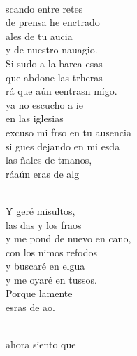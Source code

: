 \documentclass[12pt]{article}
\begin{document}
\begin{multicols*}{2}
\begin{cancion}%
	    \\
	scando entre retes\\
	de prensa he enctrado\\
	ales de tu aucia  \\
	y de nuestro nauagio.\\
	Si sudo a la barca esas\\
	que abdone las trheras\\
	rá que aún eentrasn mígo. \\
\jump
	 ya no escucho a ie \\
	en las iglesias\\
	excuso mi frso en tu ausencia\\
	si gues dejando en mi esda\\
	las ñales de tmanos,\\
	ráaún eras de  alg\\\jump\\
	\begin{chorus}%
	Y geré misultos,\\
	las das y los fraos\\
	y me pond de nuevo en cano, \\
	con los nimos refodos\\
	y  buscaré en elgua\\
	y me oyaré en tussos.\\
	Porque lamente   \\
	esras de  ao.\\
	\end{chorus}%
	\jump\\
	ahora siento que \\

\end{cancion}
\end{multicols*}
\end{document}
